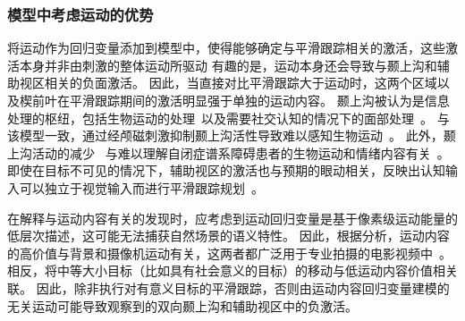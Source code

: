 



\subsubsection{模型中考虑运动的优势}
将运动作为回归变量添加到模型中，使得能够确定与平滑跟踪相关的激活，这些激活本身并非由刺激的整体运动所驱动
有趣的是，运动本身还会导致与颞上沟和辅助视区相关的负面激活。 
因此，当直接对比平滑跟踪大于运动时，这两个区域以及楔前叶在平滑跟踪期间的激活明显强于单独的运动内容。
颞上沟被认为是信息处理的枢纽，包括生物运动的处理~\cite{pinar2007superior,jastorff2009human,grossman2010fmr}以及需要社交认知的情况下的面部处理~\cite{allison2000social,hoffman2000distinct,lahnakoski2012naturalistic}。 
与该模型一致，通过经颅磁刺激抑制颞上沟活性导致难以感知生物运动~\cite{grossman2010fmr}。
此外，颞上沟活动的减少~\cite{freitag2008perception,alaerts2014underconnectivity} 与难以理解自闭症谱系障碍患者的生物运动和情绪内容有关~\cite{hubert2007brief,nackaerts2012recognizing,alaerts2014underconnectivity}。 
即使在目标不可见的情况下，辅助视区的激活也与预期的眼动相关，反映出认知输入可以独立于视觉输入而进行平滑跟踪规划~\cite{lencer2004cortical,missal2004supplementary,ohlendorf2010visual}。

在解释与运动内容有关的发现时，应考虑到运动回归变量是基于像素级运动能量的低层次描述，这可能无法捕获自然场景的语义特性。 
因此，根据分析，运动内容的高价值与背景和摄像机运动有关，这两者都广泛用于专业拍摄的电影视频中~\cite{cutting2011quicker}。
相反，将中等大小目标（比如具有社会意义的目标）的移动与低运动内容价值相关联。 
因此，除非执行对有意义目标的平滑跟踪，否则由运动内容回归变量建模的无关运动可能导致观察到的双向颞上沟和辅助视区中的负激活。


